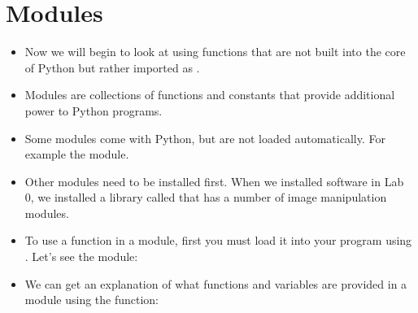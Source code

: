 \documentclass[letterpaper,10pt,english]{sphinxmanual}
\begin{document}
\section{Modules}
\label{\detokenize{lecture_notes/lec04_modules_functions1:modules}}\begin{itemize}
\item {} 
Now we will begin to look at using functions that are not built
into the core of Python but rather imported as .

\item {} 
Modules are collections of functions and constants that
provide additional power to Python programs.

\item {} 
Some modules come with Python, but are not loaded automatically. For
example the  module.

\item {} 
Other modules need to be installed first. When we installed software
in Lab 0, we installed a library called  that has a
number of image manipulation modules.

\item {} 
To use a function in a module, first you must load it into your
program using . Let’s see the  module:

\begin{sphinxVerbatim}[commandchars=\\\{\}]
 
 
\end{sphinxVerbatim}

\item {} 
We can get an explanation of what functions and variables are
provided in a module using the  function:

\begin{sphinxVerbatim}[commandchars=\\\{\}]
 
\end{sphinxVerbatim}

\end{itemize}
\end{document}
